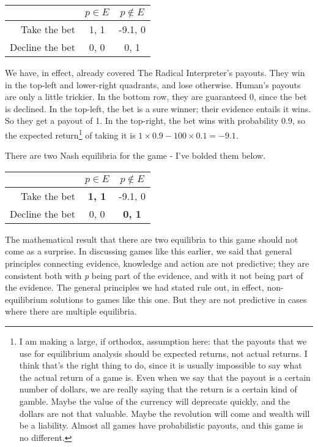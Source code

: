 \documentclass{article}
\begin{document}
\begin{center}
\begin{tabular}{r | c c}
& $p \in E$ & $p \notin E$ \\ \hline
Take the bet & 1, 1 & -9.1, 0 \\
Decline the bet & 0, 0 & 0, 1
\end{tabular}
\end{center}
We have, in effect, already covered The Radical Interpreter's payouts. They win in the top-left and lower-right quadrants, and lose otherwise. Human's payouts are only a little trickier. In the bottom row, they are guaranteed 0, since the bet is declined. In the top-left, the bet is a sure winner; their evidence entails it wins. So they get a payout of 1. In the top-right, the bet wins with probability 0.9, so the expected return\footnote{I am making a large, if orthodox, assumption here: that the payouts that we use for equilibrium analysis should be expected returns, not actual returns. I think that's the right thing to do, since it is usually impossible to say what the actual return of a game is. Even when we say that the payout is a certain number of dollars, we are really saying that the return is a certain kind of gamble. Maybe the value of the currency will deprecate quickly, and the dollars are not that valuable. Maybe the revolution will come and wealth will be a liability. Almost all games have probabilistic payouts, and this game is no different.} of taking it is $1 \times 0.9 - 100 \times 0.1 = -9.1$.

There are two Nash equilibria for the game - I've bolded them below.

\begin{center}
\begin{tabular}{r | c c}
& $p \in E$ & $p \notin E$ \\ \hline
Take the bet & \textbf{1, 1} & -9.1, 0 \\
Decline the bet & 0, 0 & \textbf{0, 1}
\end{tabular}
\end{center}
The mathematical result that there are two equilibria to this game should not come as a surprise. In discussing games like this earlier, we said that general principles connecting evidence, knowledge and action are not predictive; they are consistent both with \emph{p} being part of the evidence, and with it not being part of the evidence. The general principles we had stated rule out, in effect, non-equilibrium solutions to games like this one. But they are not predictive in cases where there are multiple equilibria. 
\end{document}
